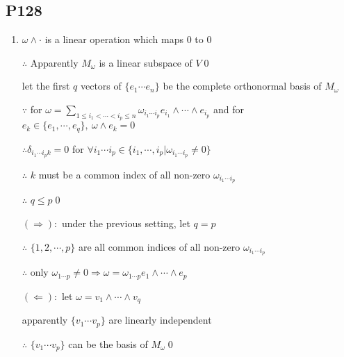 \subsection{P128}

\begin{enumerate}[4]
    \item
    $\omega \wedge \cdot$ is a linear operation which maps $0$ to $0$
    \par $\therefore$ Apparently $M_{\omega}$ is a linear subspace of $V$\qed
    \par  let the first $q$ vectors of $\{e_1 \cdots e_n\}$ be the complete orthonormal basis of $M_{\omega}$
    \par $\because$ for $\omega=\sum\limits_{1\leqslant i_1 < \cdots < i_p \leqslant n} \omega_{i_1 \cdots i_p} e_{i_1}\wedge \cdots \wedge e_{i_p}$ and for $e_k\in \{e_1,\cdots,e_q\},\ \omega \wedge e_k = 0$
    \par $\therefore \delta_{i_1 \cdots i_p k}=0$ for $\forall i_1 \cdots i_p \in  \{i_1, \cdots ,i_p|\omega_{i_1 \cdots i_p}\neq 0\}$
    \par $\therefore$ $k$ must be a common index of all non-zero $\omega_{i_1 \cdots i_p}$
    \par $\therefore$ $q\leqslant p$\qed
    \par $(\Rightarrow):$ under the previous setting, let $q=p$
    \par $\therefore$ $\{1,2,\cdots,p\}$ are all common indices of all non-zero $\omega_{i_1 \cdots i_p}$
    \par $\therefore$ only $\omega_{1\cdots p}\neq 0 \Rightarrow \omega =\omega_{1\cdots p} e_1 \wedge \cdots \wedge e_p$
    \par $(\Leftarrow):$ let $\omega =v_1 \wedge \cdots \wedge v_q$
    \par apparently $\{v_1 \cdots v_p\}$ are linearly independent
    \par $\therefore$ $\{v_1 \cdots v_p\}$ can be the basis of $M_{\omega} $\qed
\end{enumerate}